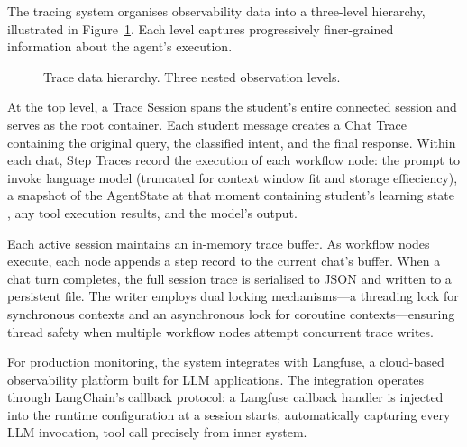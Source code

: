 The tracing system organises observability data into a three-level hierarchy, illustrated in Figure~\ref{fig:trace_model}. Each level captures progressively finer-grained information about the agent's execution.

\begin{figure}[H]
\centering
{}
    \vspace{12pt}\caption{Trace data hierarchy. Three nested observation levels.}\label{fig:trace_model}
\end{figure}

At the top level, a Trace Session spans the student's entire connected session and serves as the root container. Each student message creates a Chat Trace 
containing the original query, the classified intent, and the final response. Within each chat, Step Traces record the execution of each workflow node: 
the prompt to invoke language model (truncated for context window fit and storage effieciency), a snapshot of the AgentState at that moment containing 
student's learning state , any tool execution results, and the model's output.

Each active session maintains an in-memory trace buffer. As workflow nodes execute, each node appends a step record to the current chat's buffer. When a chat turn 
completes, the full session trace is serialised to JSON and written to a persistent file. The writer employs dual locking mechanisms---a threading lock for synchronous 
contexts and an asynchronous lock for coroutine contexts---ensuring thread safety when multiple workflow nodes attempt concurrent trace writes.

For production monitoring, the system integrates with Langfuse, a cloud-based observability platform built for LLM applications. 
The integration operates through LangChain's callback protocol: a Langfuse callback handler is injected into the runtime configuration at a 
session starts, automatically capturing every LLM invocation, tool call precisely from inner system.